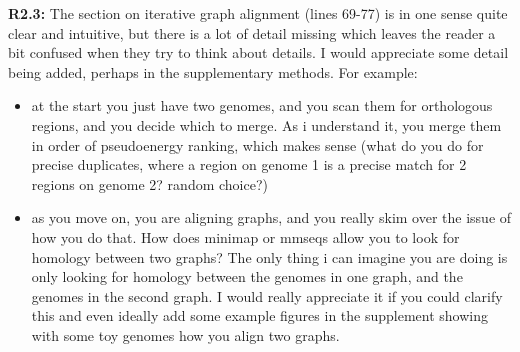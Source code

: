 \documentclass[aps,rmp,onecolumn]{revtex4-1}
\newcommand{\Marco}[1]{{\color{gray}Marco: #1}}
\newcommand{\Liam}[1]{{\color{teal}Liam: #1}}
\newcommand{\reviewer}[2]{\textbf{#1:} #2\vskip 5mm}
\begin{document}
\reviewer{R2.3}{The section on iterative graph alignment (lines 69-77) is in one sense quite clear and intuitive, but there is a lot of detail missing which leaves the reader a bit confused when they try to think about details. I would appreciate some detail being added, perhaps in the supplementary methods. For example:
      \begin{itemize}
            \item at the start you just have two genomes, and you scan them for orthologous regions, and you decide which to merge. As i understand it, you merge them in order of pseudoenergy ranking, which makes sense (what do you do for precise duplicates, where a region on genome 1 is a precise match for 2 regions on genome 2? random choice?)
            \item as you move on, you are aligning graphs, and you really skim over the issue of how you do that. How does minimap or mmseqs allow you to look for homology between two graphs? The only thing i can imagine you are doing is only looking for homology between the genomes in one graph, and the genomes in the second graph. I would really appreciate it if you could clarify this and even ideally add some example figures in the supplement showing with some toy genomes how you align two graphs.
      \end{itemize}}
\end{document}
